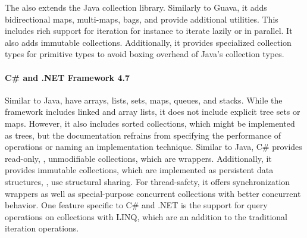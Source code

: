 \documentclass[sigconf, authorversion]{acmart}
\begin{document}

The 
also extends the Java collection library.
Similarly to Guava, it adds bidirectional maps, multi-maps, bags,
and provide additional utilities.
This includes rich support for iteration
for instance to iterate lazily or in parallel.
It also adds immutable collections.
Additionally, it provides specialized collection types for primitive types
to avoid boxing overhead of Java's collection types.


\paragraph{C\# and .NET Framework 4.7}

Similar to Java, 
have arrays, lists, sets, maps, queues, and stacks.
While the framework includes linked and array lists,
it does not include explicit tree sets or maps.
However, it also includes sorted collections,
which might be implemented as trees, but the documentation refrains from
specifying the performance of operations or naming an implementation technique.
Similar to Java, C\# provides read-only, \ie, unmodifiable collections,
which are wrappers.
Additionally, it provides immutable collections,
which are implemented as persistent data structures, \ie,
use structural sharing.
For thread-safety,
it offers synchronization wrappers
as well as special-purpose concurrent collections
with better concurrent behavior.
%
One feature specific to C\# and .NET
is the support for query operations on collections with LINQ\citep{Meijer:2011:WAL},
which are an addition to the traditional iteration operations.
\end{document}
